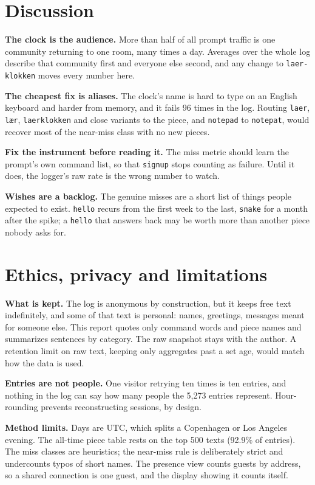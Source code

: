 \documentclass[10pt,letterpaper,twocolumn]{article}
\newcommand{\code}[1]{\texttt{#1}}
\begin{document}
\section{Discussion}
\label{sec:discussion}

\textbf{The clock is the audience.} More than half of all prompt traffic is
one community returning to one room, many times a day. Averages over the whole
log describe that community first and everyone else second, and any change to
\code{laer-klokken} moves every number here.

\textbf{The cheapest fix is aliases.} The clock's name is hard to type on an
English keyboard and harder from memory, and it fails 96 times in the log.
Routing \code{laer}, \code{lær}, \code{laerklokken} and close variants to the
piece, and \code{notepad} to \code{notepat}, would recover most of the
near-miss class with no new pieces.

\textbf{Fix the instrument before reading it.} The miss metric should learn
the prompt's own command list, so that \code{signup} stops counting as
failure. Until it does, the logger's raw rate is the wrong number to watch.

\textbf{Wishes are a backlog.} The genuine misses are a short list of things
people expected to exist. \code{hello} recurs from the first week to the
last, \code{snake} for a month after the spike; a \code{hello} that answers back may be worth more than another
piece nobody asks for.

\section{Ethics, privacy and limitations}
\label{sec:ethics}

\textbf{What is kept.} The log is anonymous by construction, but it keeps free
text indefinitely, and some of that text is personal: names, greetings,
messages meant for someone else. This report quotes only command words and
piece names and summarizes sentences by category. The raw snapshot stays with
the author. A retention limit on raw text, keeping only aggregates past a set
age, would match how the data is used.

\textbf{Entries are not people.} One visitor retrying ten times is ten
entries, and nothing in the log can say how many people the 5,273 entries
represent. Hour-rounding prevents reconstructing sessions, by design.

\textbf{Method limits.} Days are UTC, which splits a Copenhagen or Los Angeles
evening. The all-time piece table rests on the top 500 texts (92.9\% of
entries). The miss classes are heuristics; the near-miss rule is deliberately
strict and undercounts typos of short names. The presence view counts guests
by address, so a shared connection is one guest, and the display showing it
counts itself.
\end{document}
